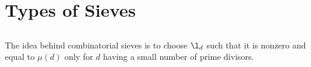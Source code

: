 \chapter{Types of Sieves}
  \section{}
    The idea behind combinatorial sieves is to choose $\l_{d}$ such that it is nonzero and equal to $\mu(d)$ only for $d$ having a small number of prime divisors. 
  \section{}
  \section{}